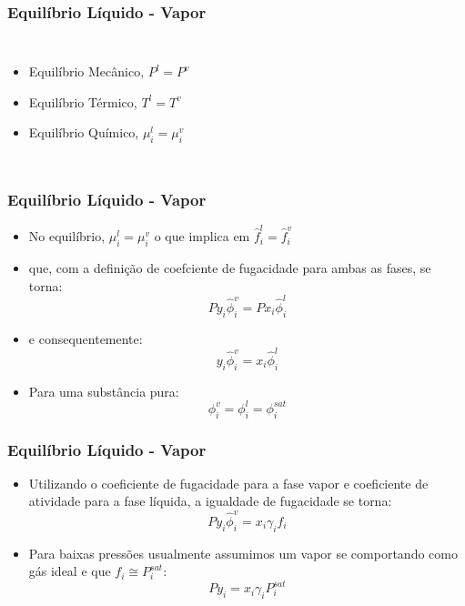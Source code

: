 \documentclass[aspectratio=169]{beamer}
\begin{document}
\begin{frame}
	\frametitle{Equilíbrio Líquido - Vapor}
	\begin{columns}
	
	\begin{itemize}
		\item Equilíbrio Mecânico, $P^l=P^v$
		\item Equilíbrio Térmico, $T^l=T^v$
		\item Equilíbrio Químico, $\mu_i^l=\mu_i^v$
	\end{itemize}
	\end{columns}
\end{frame}

\begin{frame}
	\frametitle{Equilíbrio Líquido - Vapor}
	\begin{itemize}
		\item No equilíbrio, $\mu_i^l=\mu_i^v$ o que implica em
		$\hat{f}_i^l=\hat{f}_i^v$
		\item que, com a definição de coefciente de fugacidade para ambas
		as fases, se torna:
		\begin{equation*}
		P y_i \hat{\phi}_i^v = P x_i \hat{\phi}_i^l
		\end{equation*}
		\item e consequentemente:
		\begin{equation*}
		y_i \hat{\phi}_i^v = x_i \hat{\phi}_i^l
		\end{equation*}
		\item Para uma substância pura:
		\begin{equation*}
		\phi_i^v =\phi_i^l =\phi_i^{sat}
		\end{equation*}
	\end{itemize}
\end{frame}

\begin{frame}
	\frametitle{Equilíbrio Líquido - Vapor}
	\begin{itemize}
		\item Utilizando o coeficiente de fugacidade para a fase vapor e
		coeficiente de atividade para a fase líquida, a igualdade de
		fugacidade se torna:
		\begin{equation*}
		P y_i \hat{\phi}_i^v = x_i \gamma_i f_i
		\end{equation*}
		\item Para baixas pressões usualmente assumimos um vapor se
		comportando como gás ideal e que $f_i \cong P_i^{sat}$:
		\begin{equation*}
		P y_i = x_i \gamma_i P_i^{sat}
		\end{equation*}
	\end{itemize}
\end{frame}
\end{document}
